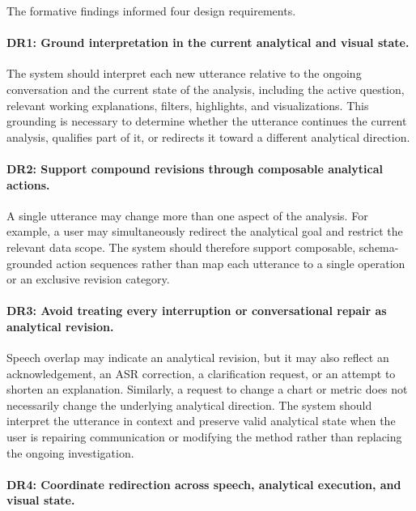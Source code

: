 \documentclass[journal]{IEEEtran}
\begin{document}
The formative findings informed four design requirements.

\paragraph{DR1: Ground interpretation in the current analytical and visual state.}

The system should interpret each new utterance relative to the ongoing
conversation and the current state of the analysis, including the active
question, relevant working explanations, filters, highlights, and
visualizations. This grounding is necessary to determine whether the utterance
continues the current analysis, qualifies part of it, or redirects it toward a
different analytical direction.

\paragraph{DR2: Support compound revisions through composable analytical
actions.}

A single utterance may change more than one aspect of the analysis. For
example, a user may simultaneously redirect the analytical goal and restrict
the relevant data scope. The system should therefore support composable,
schema-grounded action sequences rather than map each utterance to a single
operation or an exclusive revision category.

\paragraph{DR3: Avoid treating every interruption or conversational repair as
analytical revision.}

Speech overlap may indicate an analytical revision, but it may also reflect an
acknowledgement, an ASR correction, a clarification request, or an attempt to
shorten an explanation. Similarly, a request to change a chart or metric does
not necessarily change the underlying analytical direction. The system should
interpret the utterance in context and preserve valid analytical state when the
user is repairing communication or modifying the method rather than replacing
the ongoing investigation.

\paragraph{DR4: Coordinate redirection across speech, analytical execution,
and visual state.}
\end{document}
